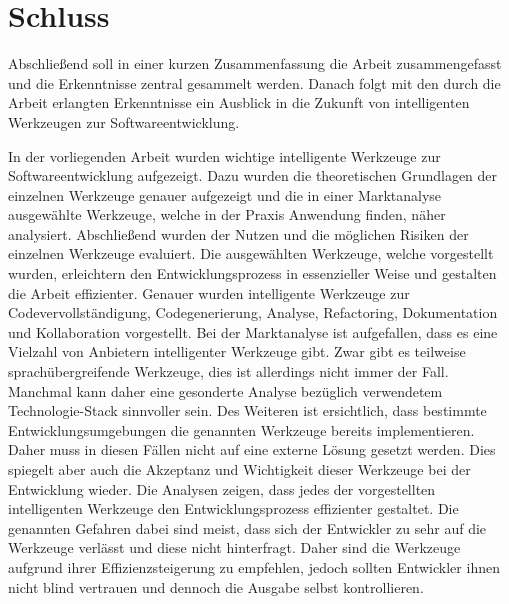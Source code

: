 \section{Schluss}
\label{sec:schluss}
Abschließend soll in einer kurzen Zusammenfassung die Arbeit zusammengefasst und die Erkenntnisse zentral gesammelt werden. Danach folgt mit den durch die Arbeit erlangten Erkenntnisse ein Ausblick in die Zukunft von intelligenten Werkzeugen zur Softwareentwicklung. 

In der vorliegenden Arbeit wurden wichtige intelligente Werkzeuge zur Softwareentwicklung aufgezeigt. Dazu wurden die theoretischen Grundlagen der einzelnen Werkzeuge genauer aufgezeigt und die in einer Marktanalyse ausgewählte Werkzeuge, welche in der Praxis Anwendung finden, näher analysiert. Abschließend wurden der Nutzen und die möglichen Risiken der einzelnen Werkzeuge evaluiert. Die ausgewählten Werkzeuge, welche vorgestellt wurden, erleichtern den Entwicklungsprozess in essenzieller Weise und gestalten die Arbeit effizienter. Genauer wurden intelligente Werkzeuge zur Codevervollständigung, Codegenerierung, Analyse, Refactoring, Dokumentation und Kollaboration vorgestellt. 
Bei der Marktanalyse ist aufgefallen, dass es eine Vielzahl von Anbietern intelligenter Werkzeuge gibt. Zwar gibt es teilweise sprachübergreifende Werkzeuge, dies ist allerdings nicht immer der Fall. Manchmal kann daher eine gesonderte Analyse bezüglich verwendetem Technologie-Stack sinnvoller sein. 
Des Weiteren ist ersichtlich, dass bestimmte Entwicklungsumgebungen die genannten Werkzeuge bereits implementieren. Daher muss in diesen Fällen nicht auf eine externe Lösung gesetzt werden. Dies spiegelt aber auch die Akzeptanz und Wichtigkeit dieser Werkzeuge bei der Entwicklung wieder. 
Die Analysen zeigen, dass jedes der vorgestellten intelligenten Werkzeuge den Entwicklungsprozess effizienter gestaltet. Die genannten Gefahren dabei sind meist, dass sich der Entwickler zu sehr auf die Werkzeuge verlässt und diese nicht hinterfragt. Daher sind die Werkzeuge aufgrund ihrer Effizienzsteigerung zu empfehlen, jedoch sollten Entwickler ihnen nicht blind vertrauen und dennoch die Ausgabe selbst kontrollieren. 

